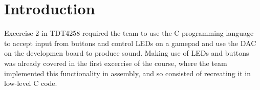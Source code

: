 \section{Introduction}
Excercise 2 in TDT4258 required the team to use the C programming language to accept input from buttons and control LEDs on a gamepad and use the DAC on the developmen board to produce sound.
Making use of LEDs and buttons was already covered in the first excercise of the course, where the team implemented this functionality in assembly, and so consisted of recreating it in low-level C code.
